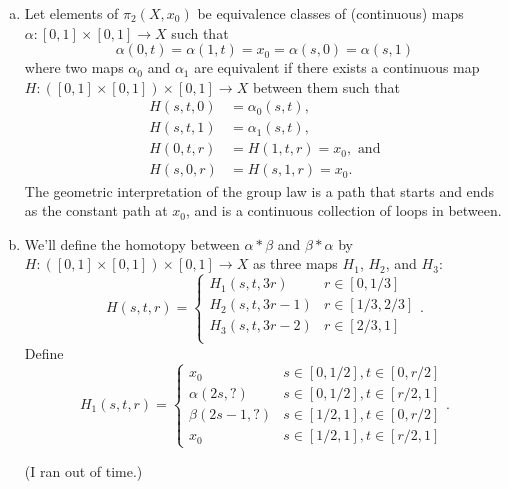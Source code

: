 \documentclass{article}
\newenvironment{solution}[1][Solution.]{\begin{trivlist}
\item[\hskip \labelsep {\bfseries #1}]}{\end{trivlist}}
\begin{document}
\begin{solution} \text{}
  \begin{enumerate}[a.]
    \item Let elements of $\pi_2(X, x_0)$ be equivalence classes of
    (continuous) maps $\alpha\colon [0,1] \times [0, 1] \rightarrow X$ such
    that \[
      \alpha(0, t) = \alpha(1, t) = x_0 = \alpha(s, 0) = \alpha(s, 1)
    \] where two maps $\alpha_0$ and $\alpha_1$ are equivalent if there exists a
    continuous map $H\colon ([0, 1] \times [0, 1]) \times [0, 1] \rightarrow X$
    between them such that \begin{align*}
      H(s, t, 0) &= \alpha_0(s, t), \\
      H(s, t, 1) &= \alpha_1(s, t), \\
      H(0, t, r) &= H(1, t, r) = x_0, \text{ and} \\
      H(s, 0, r) &= H(s, 1, r) = x_0.
    \end{align*}
    The geometric interpretation of the group law is a path that starts and ends
    as the constant path at $x_0$, and is a continuous collection of loops
    in between.
    \item We'll define the homotopy between $\alpha * \beta$ and
    $\beta * \alpha$ by
      $H\colon ([0, 1] \times [0, 1]) \times [0, 1] \rightarrow X$
    as three maps $H_1$, $H_2$, and $H_3$: \[
      H(s, t, r) = \begin{cases}
        H_1(s, t, 3r)     & r \in [0, 1/3] \\
        H_2(s, t, 3r - 1) & r \in [1/3, 2/3] \\
        H_3(s, t, 3r - 2) & r \in [2/3, 1] \\
      \end{cases}.
    \]
    Define \[
      H_1(s, t, r) = \begin{cases}
        x_0 & s \in [0, 1/2], t \in [0, r/2] \\
        \alpha(2s, ?) & s \in [0, 1/2], t \in [r/2, 1] \\
        \beta(2s - 1, ?) & s \in [1/2, 1], t \in [0, r/2] \\
        x_0 & s \in [1/2, 1], t \in [r/2, 1]
      \end{cases}.
    \]

    (I ran out of time.)
  \end{enumerate}
\end{solution}
\end{document}
